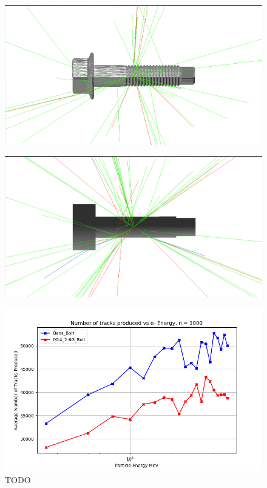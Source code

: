 \documentclass[12pt,a4paper]{article}
\begin{document}
\begin{figure}[h!]
\centering
\begin{minipage}{.5\textwidth}
  \centering
  \includegraphics[height=.5\linewidth]{Images//CAD_Screw//Screw_hnh_10MeVe.png}
  \label{notmybolt}
\end{minipage}%
\begin{minipage}{.5\textwidth}
  \centering
  \includegraphics[height=.5\linewidth]{Images//CAD_Screw//bensboltinbdsim.png}
  \label{mybolt}
\end{minipage}%
\end{figure}

\begin{figure}[h!]
\centering
\includegraphics[scale=0.7]{Images//CAD_Screw//boltcount.png}
\caption[width=\columnwidth]{TODO}
\label{sphbd}
\end{figure}
\end{document}
